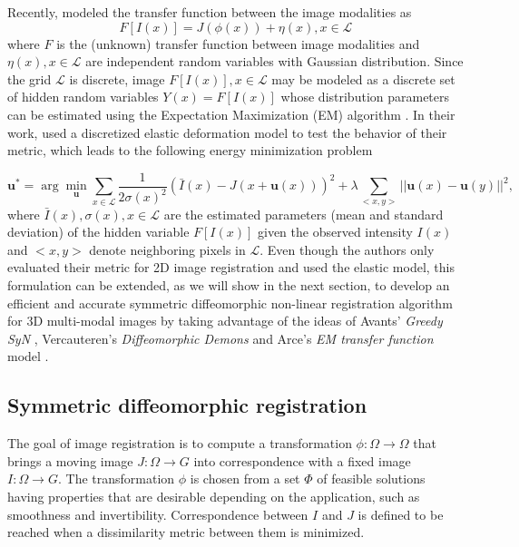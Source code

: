 Recently, \cite{Arce-santana2014} modeled the transfer function between the image modalities as
\begin{equation}\label{eq:arce_model}
    F[I(x)] = J(\phi(x)) + \eta(x), x\in \mathcal{L}
\end{equation}
where $F$ is the (unknown) transfer function between image modalities and $\eta(x), x\in \mathcal{L}$ are independent random variables with Gaussian distribution. Since the grid $\mathcal{L}$ is discrete, image $F[I(x)], x\in \mathcal{L}$ may be modeled as a discrete set of hidden random variables $Y(x) = F[I(x)]$ whose distribution parameters
can be estimated using the Expectation Maximization (EM) algorithm \citep{Dempster1977}. In their work, \cite{Arce-santana2014} used a discretized elastic
deformation model to test the behavior of their metric, which leads to the following energy minimization problem

\begin{equation}\label{eq:arce_elastic}
    \mathbf{u}^{*} = \arg \min_{\mathbf{u}} \sum_{x \in \mathcal{L}} \frac{1}{2 \sigma(x)^{2}} ( \bar{I}(x) - J(x + \mathbf{u}(x)))^{2} + \lambda \sum_{<x, y>} ||\mathbf{u}(x) - \mathbf{u}(y)||^{2},
\end{equation}
where $\bar{I}(x), \sigma(x), x\in \mathcal{L}$ are the estimated parameters (mean and standard deviation) of the hidden variable $F[I(x)]$ given the
observed intensity $I(x)$ and $<x, y>$ denote neighboring pixels in $\mathcal{L}$. Even though the authors only evaluated their metric for 2D image registration and used
the elastic model, this formulation can be extended, as we will show in the next section, to develop an efficient and accurate symmetric diffeomorphic non-linear registration algorithm for 3D multi-modal images by taking advantage of the ideas of Avants' \textit{Greedy SyN} \citep{Avants2008}, Vercauteren's \textit{Diffeomorphic Demons} \citep{Vercauteren2009} and Arce's \textit{EM transfer function} model \citep{Arce-santana2014}.

\subsection{Symmetric diffeomorphic registration}

The goal of image registration is to compute a transformation $\phi: \Omega \rightarrow \Omega$ that brings a moving image $J:\Omega \rightarrow G$ into correspondence
with a fixed image $I:\Omega \rightarrow G$. The transformation $\phi$ is chosen from a set $\Phi$ of feasible solutions having properties that are desirable depending on the
application, such as smoothness and invertibility. Correspondence between $I$ and $J$ is defined to be reached when a dissimilarity metric between them is minimized.\\

